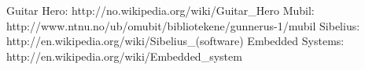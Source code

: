 \begin{thebibliography}{9}

Guitar Hero: 
http://no.wikipedia.org/wiki/Guitar\_Hero
Mubil: 
http://www.ntnu.no/ub/omubit/bibliotekene/gunnerus-1/mubil
Sibelius: 
http://en.wikipedia.org/wiki/Sibelius\_(software)
Embedded Systems: 
http://en.wikipedia.org/wiki/Embedded\_system

\end{thebibliography}
